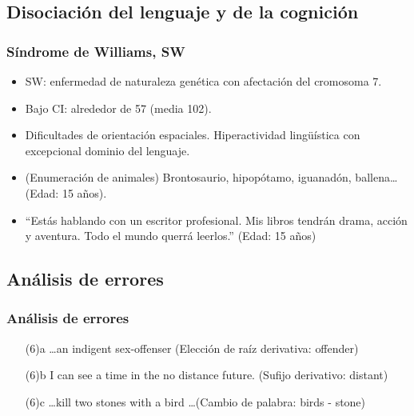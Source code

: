 \documentclass[compress]{beamer}
\begin{document}
	\subsection{Disociación del lenguaje y de la cognición}
	\begin{frame}
		\frametitle{Síndrome de Williams, SW}
		\begin{itemize}
		\item SW: enfermedad de naturaleza genética con afectación del cromosoma 7.
		\item Bajo CI: alrededor de 57 (media 102).
		\item Dificultades de orientación espaciales. Hiperactividad lingüística con excepcional dominio del lenguaje.
		\item (Enumeración de animales) \alert{Brontosaurio, hipopótamo, iguanadón, ballena}\ldots (Edad: 15 años).
		\item ``Estás hablando con un escritor profesional. Mis libros tendrán drama, acción y aventura. Todo el mundo querrá leerlos.'' (Edad: 15 años)
		\end{itemize}
	\end{frame}
	
	\subsection{Análisis de errores}
	\begin{frame}
	\frametitle{Análisis de errores}

	\begin{enumerate}
	\item[(6)a] \ldots an indigent sex-\alert{offens}er (Elección de raíz derivativa: \alert{offend}er)

	\item[(6)b]  I can see a time in the no distan\alert{ce} future. (Sufijo derivativo: dista\alert{nt})

	\item[(6)c] \ldots kill two \alert{stone}s with a \alert{bird} \ldots (Cambio de palabra: \alert{bird}s - \alert{stone})

	\end{enumerate}
	\end{frame}
\end{document}
